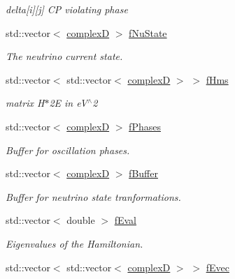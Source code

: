 \begin{DoxyCompactItemize}
\begin{DoxyCompactList}\small\item\em delta\mbox{[}i\mbox{]}\mbox{[}j\mbox{]} CP violating phase \end{DoxyCompactList}\item 
std\+::vector$<$ \hyperlink{EigenPoint_8h_a67ca8e107e20610c3fff78d5e726ece0}{complexD} $>$ \hyperlink{classOscProb_1_1PMNS__Base_abf99f2339e3ee989600740b5d88063e8}{f\+Nu\+State}
\begin{DoxyCompactList}\small\item\em The neutrino current state. \end{DoxyCompactList}\item 
std\+::vector$<$ std\+::vector$<$ \hyperlink{EigenPoint_8h_a67ca8e107e20610c3fff78d5e726ece0}{complexD} $>$ $>$ \hyperlink{classOscProb_1_1PMNS__Base_acd3c8783e7603081eab316ea4c86c766}{f\+Hms}
\begin{DoxyCompactList}\small\item\em matrix H$\ast$2E in e\+V$^\wedge$2 \end{DoxyCompactList}\item 
std\+::vector$<$ \hyperlink{EigenPoint_8h_a67ca8e107e20610c3fff78d5e726ece0}{complexD} $>$ \hyperlink{classOscProb_1_1PMNS__Base_ab8d26b722047d49d977f5f2d83026ede}{f\+Phases}
\begin{DoxyCompactList}\small\item\em Buffer for oscillation phases. \end{DoxyCompactList}\item 
std\+::vector$<$ \hyperlink{EigenPoint_8h_a67ca8e107e20610c3fff78d5e726ece0}{complexD} $>$ \hyperlink{classOscProb_1_1PMNS__Base_a5440bc3efa466a37649601abce559e3e}{f\+Buffer}
\begin{DoxyCompactList}\small\item\em Buffer for neutrino state tranformations. \end{DoxyCompactList}\item 
std\+::vector$<$ double $>$ \hyperlink{classOscProb_1_1PMNS__Base_a6319c34d7decbb9d7d6da279c06e8c2d}{f\+Eval}
\begin{DoxyCompactList}\small\item\em Eigenvalues of the Hamiltonian. \end{DoxyCompactList}\item 
std\+::vector$<$ std\+::vector$<$ \hyperlink{EigenPoint_8h_a67ca8e107e20610c3fff78d5e726ece0}{complexD} $>$ $>$ \hyperlink{classOscProb_1_1PMNS__Base_a87be137356c5f27ab83cab5e1298ef8f}{f\+Evec}

\end{DoxyCompactItemize}
